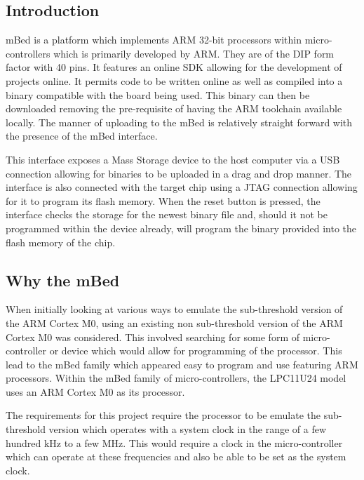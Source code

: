 
\subsection{Introduction}

mBed is a platform which implements ARM 32-bit processors within micro-controllers which is primarily developed by ARM. They are of the DIP form factor with 40 pins. It features an online SDK allowing for the development of projects online. It permits code to be written online as well as compiled into a binary compatible with the board being used. This binary can then be downloaded removing the pre-requisite of having the ARM toolchain available locally. The manner of uploading to the mBed is relatively straight forward with the presence of the mBed interface. \cite{mbed_website}

This interface exposes a Mass Storage device to the host computer via a USB connection allowing for binaries to be uploaded in a drag and drop manner. The interface is also connected with the target chip using a JTAG connection allowing for it to program its flash memory. When the reset button is pressed, the interface checks the storage for the newest binary file and, should it not be programmed within the device already, will program the binary provided into the flash memory of the chip. \cite{mbed_website}

\subsection{Why the mBed}

When initially looking at various ways to emulate the sub-threshold version of the ARM Cortex M0, using an existing non sub-threshold version of the ARM Cortex M0 was considered. This involved searching for some form of micro-controller or device which would allow for programming of the processor. This lead to the mBed family which appeared easy to program and use featuring ARM processors. Within the mBed family of micro-controllers, the LPC11U24 model uses an ARM Cortex M0 as its processor.

The requirements for this project require the processor to be emulate the sub-threshold version which operates with a system clock in the range of a few hundred kHz to a few MHz. This would require a clock in the micro-controller which can operate at these frequencies and also be able to be set as the system clock.

